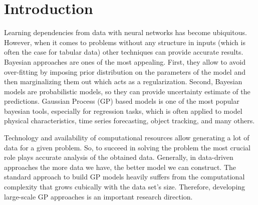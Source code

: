 \chapter{Introduction}
\label{chap:intro}







Learning dependencies from data with neural networks has become ubiquitous.
However, when it comes to problems without any structure in inputs (which is often the case for tabular data)
other techniques can provide accurate results.
Bayesian approaches are ones of the most appealing.
First, they allow to avoid over-fitting by imposing
prior distribution on the parameters of the model and then marginalizing them out
which acts as a regularization.
Second, Bayesian models are probabilistic models,
so they can provide uncertainty estimate of the predictions.
Gaussian Process (GP) based models is one of the most popular bayesian tools,
especially for regression tasks, which is often applied to model physical characteristics,
time series forecasting, object tracking, and many others.

Technology and availability of computational resources allow generating
a lot of data for a given problem.
So, to succeed in solving the problem the most crucial role plays
accurate analysis of the obtained data.
Generally, in data-driven approaches the more data we have, the better model
we can construct.
The standard approach to build GP models heavily suffers from the computational
complexity that grows cubically with the data set's size.
Therefore, developing large-scale GP approaches is
an important research direction.

